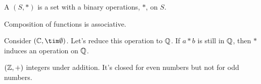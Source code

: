 \documentclass[class=article,crop=false]{standalone}
\begin{document}
\begin{defn}
	A  $(S,*)$ is a set with a binary operations, $*$, on  $S$.
\end{defn}

\begin{thm}
Composition of functions is associative.
\end{thm}

Consider $(\cc,\tim\O)$. Let's reduce this operation to $\mathbb{Q}$.
If $a*b$ is still in $\mathbb{Q}$, then $*$ induces an operation on  $\mathbb{Q}$.

\begin{eg}[]
	$(\mathbb{Z},+)$ integers under addition. It's closed for even numbers but not for odd numbers.
\end{eg}
\end{document}
